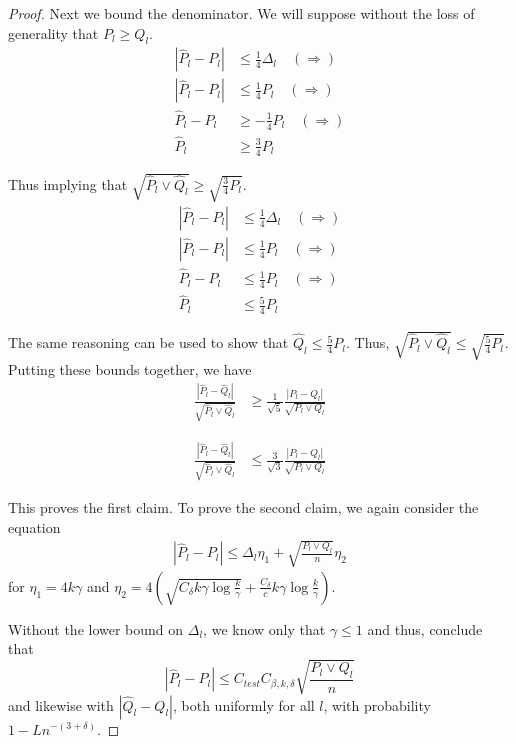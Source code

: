 \documentclass{article}
\begin{document}
\begin{proof}
Next we bound the denominator. We will suppose without the loss of generality that $P_l \geq Q_l$. 
\begin{align*}
| \hat{P}_l - P_l | &\leq \frac{1}{4} \Delta_l  \quad (\Rightarrow) \\
|\hat{P}_l - P_l| &\leq \frac{1}{4} P_l \quad (\Rightarrow) \\
\hat{P}_l - P_l &\geq - \frac{1}{4} P_l \quad (\Rightarrow) \\
\hat{P}_l &\geq \frac{3}{4} P_l 
\end{align*}

Thus implying that $\sqrt{ \hat{P}_l \vee \hat{Q}_l } \geq \sqrt{ \frac{3}{4} P_l}$. 
\begin{align*}
| \hat{P}_l - P_l | &\leq \frac{1}{4} \Delta_l \quad (\Rightarrow) \\
| \hat{P}_l - P_l| &\leq \frac{1}{4} P_l \quad (\Rightarrow) \\
\hat{P}_l - P_l &\leq \frac{1}{4} P_l \quad (\Rightarrow) \\
\hat{P}_l &\leq \frac{5}{4} P_l 
\end{align*}

The same reasoning can be used to show that $\hat{Q}_l \leq \frac{5}{4} P_l$. Thus, $\sqrt{ \hat{P}_l \vee \hat{Q}_l } \leq \sqrt{ \frac{5}{4} P_l }$. Putting these bounds together, we have
\begin{align*}
\frac{ | \hat{P}_l - \hat{Q}_l |}{\sqrt{\hat{P}_l \vee \hat{Q}_l}} &\geq 
          \frac{1}{\sqrt{5}} \frac{| P_l - Q_l | }{ \sqrt{ P_l \vee Q_l} }
\end{align*}

\begin{align*}
\frac{ | \hat{P}_l - \hat{Q}_l |}{\sqrt{\hat{P}_l \vee \hat{Q}_l}} &\leq 
          \frac{3}{\sqrt{3}} \frac{| P_l - Q_l |}{\sqrt{P_l \vee Q_l}} 
\end{align*}

This proves the first claim. To prove the second claim, we again consider the equation
\begin{align*}
|\hat{P}_l - P_l| \leq \Delta_l \eta_1 + \sqrt{\frac{P_l \vee Q_l}{n} }\eta_2
\end{align*}
for $\eta_1 = 4 k \gamma$ and 
$\eta_2 = 4 \left( \sqrt{ C_\delta k \gamma \log \frac{k}{\gamma}} + \frac{C_\delta}{c} k \gamma \log \frac{k}{\gamma} \right)$. 

Without the lower bound on $\Delta_l$, we know only that $\gamma \leq 1$ and thus, conclude that
\[
| \hat{P}_l - P_l | \leq C_{test} C_{\beta, k, \delta} \sqrt{ \frac{P_l \vee Q_l}{n} } 
\]
and likewise with $|\hat{Q}_l - Q_l|$, both uniformly for all $l$, with probability $1 - L n^{-(3+\delta)}$. 


\end{proof}
\end{document}
